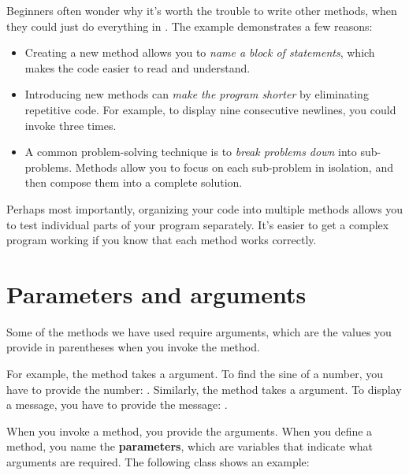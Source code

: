 Beginners often wonder why it's worth the trouble to write other methods, when they could just do everything in .
The  example demonstrates a few reasons:

\begin{itemize}

\item Creating a new method allows you to {\em name a block of statements}, which makes the code easier to read and understand.

\item Introducing new methods can {\em make the program shorter} by eliminating repetitive code.
For example, to display nine consecutive newlines, you could invoke  three times.

\item A common problem-solving technique is to {\em break problems down} into sub-problems.
Methods allow you to focus on each sub-problem in isolation, and then compose them into a complete solution.

\end{itemize}

Perhaps most importantly, organizing your code into multiple methods allows you to test individual parts of your program separately.
It's easier to get a complex program working if you know that each method works correctly.


\section{Parameters and arguments}

Some of the methods we have used require arguments, which are the values you provide in parentheses when you invoke the method.

For example, the  method takes a  argument.
To find the sine of a number, you have to provide the number: .
Similarly, the  method takes a  argument.
To display a message, you have to provide the message: .


When you invoke a method, you provide the arguments.
When you define a method, you name the {\bf parameters}, which are variables that indicate what arguments are required.
The following class shows an example:

